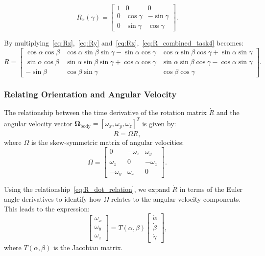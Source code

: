 \documentclass[12pt]{article}
\begin{document}
\begin{equation}
\label{eq:Rx}
R_x(\gamma) =
\begin{bmatrix}
1 & 0 & 0 \\
0 & \cos\gamma & -\sin\gamma \\
0 & \sin\gamma & \cos\gamma
\end{bmatrix}.
\end{equation}

By multiplying~\ref{eq:Rz},~\ref{eq:Ry} and~\ref{eq:Rx},~\ref{eq:R_combined_task4} becomes:
\begin{equation}
\label{eq:R_full_task4}
R =
\begin{bmatrix}
\cos\alpha\cos\beta & \cos\alpha\sin\beta\sin\gamma - \sin\alpha\cos\gamma & \cos\alpha\sin\beta\cos\gamma + \sin\alpha\sin\gamma \\
\sin\alpha\cos\beta & \sin\alpha\sin\beta\sin\gamma + \cos\alpha\cos\gamma & \sin\alpha\sin\beta\cos\gamma - \cos\alpha\sin\gamma \\
-\sin\beta & \cos\beta\sin\gamma & \cos\beta\cos\gamma
\end{bmatrix}.
\end{equation}

\subsubsection{Relating Orientation and Angular Velocity}

The relationship between the time derivative of the rotation matrix \(\dot{R}\) and the angular velocity vector \(\boldsymbol{\Omega}_{\text{body}} = [\omega_x, \omega_y, \omega_z]^T\) is given by:
\begin{equation}
\label{eq:R_dot_relation}
\dot{R} = \Omega R,
\end{equation}
where \(\Omega\) is the skew-symmetric matrix of angular velocities:
\begin{equation}
\label{eq:omega_skew}
\Omega =
\begin{bmatrix}
0 & -\omega_z & \omega_y \\
\omega_z & 0 & -\omega_x \\
-\omega_y & \omega_x & 0
\end{bmatrix}.
\end{equation}

Using the relationship~\ref{eq:R_dot_relation}, we expand \(\dot{R}\) in terms of the Euler angle derivatives to identify how \(\Omega\) relates to the angular velocity components. This leads to the expression:
\begin{equation}
\label{eq:omega_body_decomposition}
\begin{bmatrix}
\omega_x \\
\omega_y \\
\omega_z
\end{bmatrix}
=
T(\alpha, \beta)
\begin{bmatrix}
\dot{\alpha} \\
\dot{\beta} \\
\dot{\gamma}
\end{bmatrix},
\end{equation}
where \(T(\alpha, \beta)\) is the Jacobian matrix.
\end{document}
